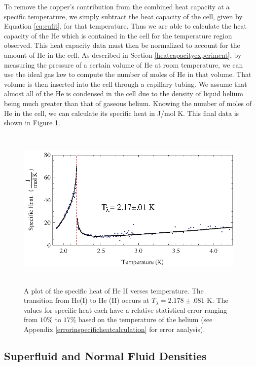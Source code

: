 To remove the copper's contribution from the combined heat capacity at a specific temperature, we simply subtract the heat capacity of the cell, given by Equation \ref{eq:cufit}, for that temperature. Thus we are able to calculate the heat capacity of the He which is contained in the cell for the temperature region observed.  This heat capacity data must then be normalized to account for the amount of He in the cell. As described in Section \ref{heatcapacityexperiment}, by measuring the pressure of a certain volume of He at room temperature, we can use the ideal gas law to compute the number of moles of He in that volume.  That volume is then inserted into the cell through a capillary tubing.  We assume that almost all of the He is condensed in the cell due to the density of liquid helium being much greater than that of gaseous helium.  Knowing the number of moles of He in the cell, we can calculate its specific heat in J/mol K. This final data is shown in Figure \ref{fig:lambdatrans}.

\begin{figure}[htbp]
\begin{center}
\includegraphics[height=80mm]{./figures/lambdatrans.eps}
\caption{\small{A plot of the specific heat of He II verses temperature. The transition from He(I) to He (II) occurs at $T_{\lambda} = 2.178 \pm .081$ K.  The values for specific heat each have a relative statistical error ranging from $10\%$  to $17\%$ based on the temperature of the helium (see Appendix \ref{errorinspecificheatcalculation} for error analysis).}}
\label{fig:lambdatrans}
\end{center}
\end{figure}

\subsection{Superfluid and Normal Fluid Densities}\label{superfluiddensity}


